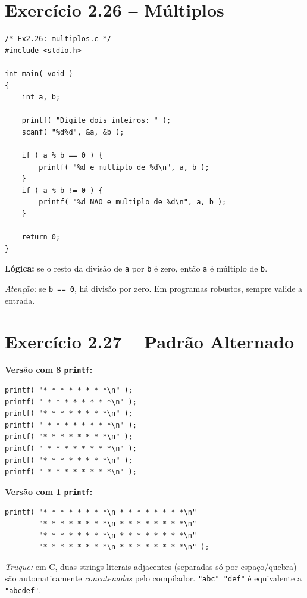 \documentclass[12pt,a4paper]{article}
\begin{document}
\newpage

\section{Exercício 2.26 -- Múltiplos}

\begin{respostabox}
\begin{lstlisting}
/* Ex2.26: multiplos.c */
#include <stdio.h>

int main( void )
{
    int a, b;

    printf( "Digite dois inteiros: " );
    scanf( "%d%d", &a, &b );

    if ( a % b == 0 ) {
        printf( "%d e multiplo de %d\n", a, b );
    }
    if ( a % b != 0 ) {
        printf( "%d NAO e multiplo de %d\n", a, b );
    }

    return 0;
}
\end{lstlisting}

\textbf{Lógica:} se o resto da divisão de \texttt{a} por \texttt{b} é zero,
então \texttt{a} é múltiplo de \texttt{b}.

\textit{Atenção:} se \texttt{b == 0}, há divisão por zero. Em programas
robustos, sempre valide a entrada.
\end{respostabox}

\section{Exercício 2.27 -- Padrão Alternado}

\begin{respostabox}
\textbf{Versão com 8 \texttt{printf}:}
\begin{lstlisting}
printf( "* * * * * * * *\n" );
printf( " * * * * * * * *\n" );
printf( "* * * * * * * *\n" );
printf( " * * * * * * * *\n" );
printf( "* * * * * * * *\n" );
printf( " * * * * * * * *\n" );
printf( "* * * * * * * *\n" );
printf( " * * * * * * * *\n" );
\end{lstlisting}

\textbf{Versão com 1 \texttt{printf}:}
\begin{lstlisting}
printf( "* * * * * * * *\n * * * * * * * *\n"
        "* * * * * * * *\n * * * * * * * *\n"
        "* * * * * * * *\n * * * * * * * *\n"
        "* * * * * * * *\n * * * * * * * *\n" );
\end{lstlisting}

\textit{Truque:} em C, duas strings literais adjacentes (separadas só por
espaço/quebra) são automaticamente \textit{concatenadas} pelo compilador.
\texttt{"abc" "def"} é equivalente a \texttt{"abcdef"}.
\end{respostabox}
\end{document}
